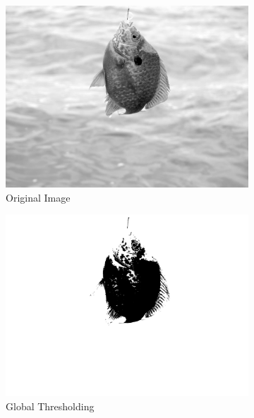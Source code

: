 \begin{figure}[H]
    \centering
    \begin{subfigure}{0.33\textwidth}
        \centering
        \includegraphics[width=.99\linewidth]{images/literature/thresholding/original_fish_grayscale}
        \caption{Original Image\cite{website:colorfish_image}}
    \end{subfigure}%
    \begin{subfigure}{.33\textwidth}
        \centering
        \includegraphics[width=.99\linewidth]{images/literature/thresholding/fish_global_thresholding}
        \caption{Global Thresholding}
    \end{subfigure}%
    \begin{subfigure}{.33\textwidth}

\end{subfigure}
\end{figure}

